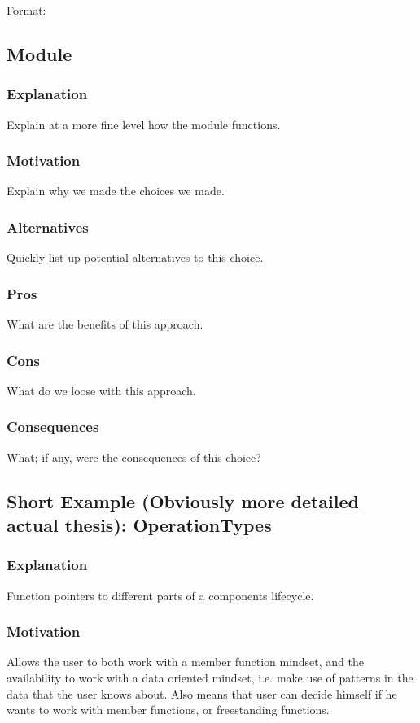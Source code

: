 Format:

\subsection{Module}
\subsubsection{Explanation}
Explain at a more fine level how the module functions.

\subsubsection{Motivation}
Explain why we made the choices we made.

\subsubsection{Alternatives}
Quickly list up potential alternatives to this choice.

\subsubsection{Pros}
What are the benefits of this approach.

\subsubsection{Cons}
What do we loose with this approach.

\subsubsection{Consequences}
What; if any, were the consequences of this choice?

\subsection{Short Example (Obviously more detailed actual thesis): OperationTypes}
\subsubsection{Explanation}
Function pointers to different parts of a components lifecycle.

\subsubsection{Motivation}
Allows the user to both work with a member function mindset,
and the availability to work with a data oriented mindset, i.e. make use of patterns in the data that the user knows about.
Also means that user can decide himself if he wants to work with member functions, or freestanding functions.

